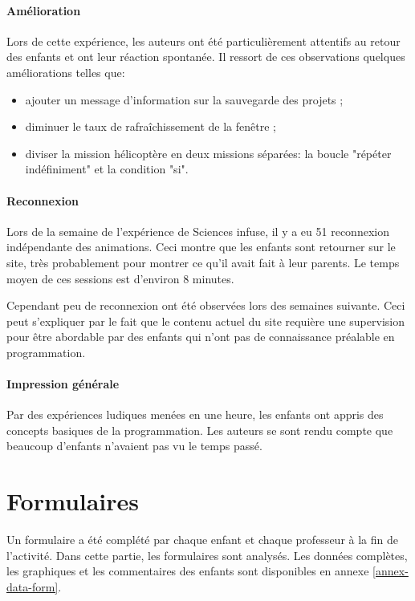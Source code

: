 \paragraph{Amélioration}
Lors de cette expérience, les auteurs ont été particulièrement attentifs au retour des enfants et ont leur réaction spontanée. Il ressort de ces observations quelques améliorations telles que:
\begin{itemize}
  \item ajouter un message d'information sur la sauvegarde des projets ;
  \item diminuer le taux de rafraîchissement de la fenêtre ;
  \item diviser la \gls{mission} hélicoptère en deux \glspl{mission} séparées: la boucle "répéter indéfiniment" et la condition "si".
\end{itemize}

\paragraph{Reconnexion}
Lors de la semaine de l'expérience de Sciences infuse, il y a eu 51 reconnexion indépendante des animations. Ceci montre que les enfants sont retourner sur le site, très probablement pour montrer ce qu'il avait fait à leur parents. Le temps moyen de ces sessions est d'environ 8 minutes. 

Cependant peu de reconnexion ont été observées lors des semaines suivante. Ceci peut s'expliquer par le fait que le contenu actuel du site requière une supervision pour être abordable par des enfants qui n'ont pas de connaissance préalable en programmation.

\paragraph{Impression générale}
Par des expériences ludiques menées en une heure, les enfants ont appris des concepts basiques de la programmation. Les auteurs se sont rendu compte que beaucoup d'enfants n'avaient pas vu le temps passé.


\section{Formulaires}
\label{analyse-exp}
Un formulaire a été complété par chaque enfant et chaque professeur à la fin de l'activité. Dans cette partie, les formulaires sont analysés. Les données complètes, les graphiques et les commentaires des enfants sont disponibles en annexe \ref{annex-data-form}. %

